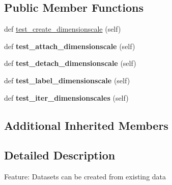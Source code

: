\subsection*{Public Member Functions}
\begin{DoxyCompactItemize}
\item 
def \hyperlink{classh5py__LOCAL_1_1tests_1_1old_1_1test__dimension__scales_1_1TestH5DSBindings_ab0fb15b640c122e91a0df769b8d92924}{test\+\_\+create\+\_\+dimensionscale} (self)
\item 
\mbox{\label{classh5py__LOCAL_1_1tests_1_1old_1_1test__dimension__scales_1_1TestH5DSBindings_a186c5a7e4bd3503883666f015936e426}} 
def {\bfseries test\+\_\+attach\+\_\+dimensionscale} (self)
\item 
\mbox{\label{classh5py__LOCAL_1_1tests_1_1old_1_1test__dimension__scales_1_1TestH5DSBindings_aa0f7460cf693d2ccc6b6962492b031f4}} 
def {\bfseries test\+\_\+detach\+\_\+dimensionscale} (self)
\item 
\mbox{\label{classh5py__LOCAL_1_1tests_1_1old_1_1test__dimension__scales_1_1TestH5DSBindings_a5c5236bfedef9869749c6ae1b89b3cc2}} 
def {\bfseries test\+\_\+label\+\_\+dimensionscale} (self)
\item 
\mbox{\label{classh5py__LOCAL_1_1tests_1_1old_1_1test__dimension__scales_1_1TestH5DSBindings_a9e99694a8addf315d89e82d6d1244cfd}} 
def {\bfseries test\+\_\+iter\+\_\+dimensionscales} (self)
\end{DoxyCompactItemize}
\subsection*{Additional Inherited Members}


\subsection{Detailed Description}
\begin{DoxyVerb}    Feature: Datasets can be created from existing data
\end{DoxyVerb}
 

